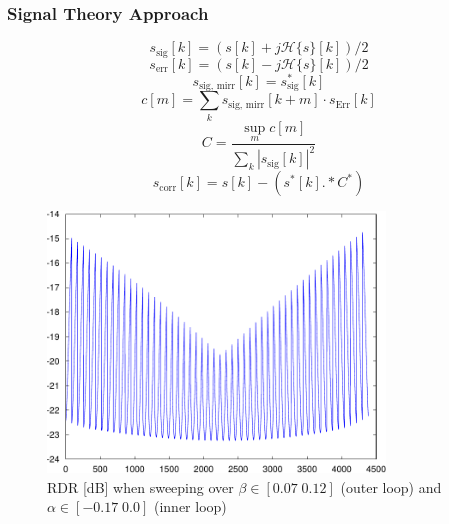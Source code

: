 \subsubsection{Signal Theory Approach}
\[s_{\text{sig}}[k] = (s[k] + j \mathcal{H}\{s\}[k])/2 \]
\[s_{\text{err}}[k] = (s[k] - j \mathcal{H}\{s\}[k])/2 \]
\[s_{\text{sig, mirr}}[k] = s_{\text{sig}}^*[k]\]
\[c[m] = \sum_k s_{\text{sig, mirr}}[k+m] \cdot s_{\text{Err}}[k] \]
\[C = \frac{\sup_m c[m]}{\sum_k |s_{\text{sig}}[k]|^2}\]
\[s_{\text{corr}}[k] = s[k] - (s^*[k] .* C^*)\]

\begin{figure}[p]
  \centering
  \includegraphics[width=0.8\textwidth]{figures/matlab/res_1350_ab_sweep}
  \caption{\gls{RDR} [dB] when sweeping over $\beta \in [0.07 \; 0.12]$
    (outer loop) and $\alpha \in [-0.17 \; 0.0]$ (inner loop)}
  \label{fig:res_1350_ab_sweep}
\end{figure}

